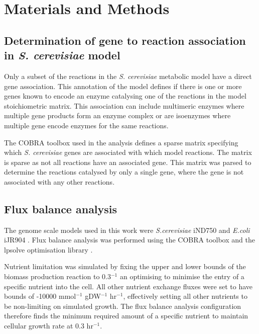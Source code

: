 \clearpage

\section{Materials and Methods}%

\subsection{Determination of gene to reaction association in \emph{S. cerevisiae} model}

Only a subset of the reactions in the \emph{S. cerevisiae} metabolic model have a direct gene association. This annotation of the model defines if there is one or more genes known to encode an enzyme catalysing one of the reactions in the model stoichiometric matrix. This association can include multimeric enzymes where multiple gene products form an enzyme complex or are isoenzymes where multiple gene encode enzymes for the same reactions.

The COBRA toolbox used in the analysis defines a sparse matrix specifying which \emph{S. cerevisiae} genes are associated with which model reactions. The matrix is sparse as not all reactions have an associated gene. This matrix was parsed to determine the reactions catalysed by only a single gene, where the gene is not associated with any other reactions.

\subsection{Flux balance analysis}

The genome scale models used in this work were \emph{S.cerevisiae} iND750 \cite{duarte2004a} and \emph{E.coli} iJR904 \cite{reed2003}. Flux balance analysis was performed using the COBRA toolbox \cite{becker2007} and the lpsolve optimisation library \cite{lpsolve}.

Nutrient limitation was simulated by fixing the upper and lower bounds of the biomass production reaction to 0.3$^{-1}$ an optimising to minimise the entry of a specific nutrient into the cell. All other nutrient exchange fluxes were set to have bounds of -10000 mmol$^{-1}$ gDW$^{-1}$ hr$^{-1}$, effectively setting all other nutrients to be non-limiting on simulated growth. The flux balance analysis configuration therefore finds the minimum required amount of a specific nutrient to maintain cellular growth rate at 0.3 hr$^{-1}$.

